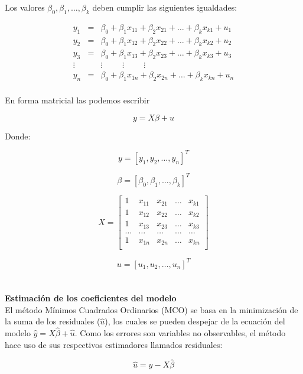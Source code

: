 \documentclass[base=hide,12pt]{elegantbook}
\begin{document}
	Los valores $\beta_{0},\beta_{1},\dots,\beta_{k}$ deben cumplir las siguientes igualdades:
\begin{center}
		\begin{eqnarray*}
		y_{1}&=&\beta_{0}+\beta_{1}x_{11}+\beta_{2}x_{21}+\dots+\beta_{k}x_{k1}+u_{1} \\
		y_{2}&=&\beta_{0}+\beta_{1}x_{12}+\beta_{2}x_{22}+\dots+\beta_{k}x_{k2}+u_{2} \\
		y_{3}&=&\beta_{0}+\beta_{1}x_{13}+\beta_{2}x_{23}+\dots+\beta_{k}x_{k3}+u_{3} \\
		\vdots && \vdots \hspace{1cm} \vdots \hspace{1cm} \vdots \\
		y_{n}&=&\beta_{0}+\beta_{1}x_{1n}+\beta_{2}x_{2n}+\dots+\beta_{k}x_{kn}+u_{n} \\
	\end{eqnarray*}
\end{center}

	En forma matricial las podemos escribir
\begin{Box2}{}	
	\begin{equation*}
	y = X \beta + u 
	\end{equation*}
\end{Box2}

	Donde: 
	
	$$y = [y_{1},y_{2}, \dots, y_{n}]^{T}$$ 
	
	$$\beta =[\beta_{0},\beta_{1},\dots, \beta_{k}]^{T}$$
	
	$$X= \begin{bmatrix}
	{1}   &{x_{11}}&{x_{21}}& \dots & x_{k1}  \\
	{1}   &{x_{12}}&{x_{22}}& \dots & x_{k2}  \\
	{1}   &{x_{13}}&{x_{23}}& \dots & x_{k3}  \\
	\dots & \dots  &\dots   & \dots & \dots \\
	{1}   &{x_{1n}}&{x_{2n}}& \dots & x_{kn} \\
	\end{bmatrix}$$
	
	$$u =[u_{1},u_{2},\dots,u_{n}]^{T}$$   \\ \\
	
	
	\textcolor{col4}{\Large \bf Estimación de los coeficientes del modelo} 	
	\\
	
El método Mínimos Cuadrados Ordinarios (MCO) se basa en la minimización de la suma de los residuales ($\widehat{u}$), los cuales se pueden despejar de la ecuación del modelo $\widehat{y} = X \widehat{\beta} + \widehat{u}$. Como los errores son variables no observables, el método hace uso de sus respectivos estimadores llamados residuales:
\begin{Box2}{}
	\begin{equation*}
	\widehat{u} = \widehat{y} - X\widehat{\beta}
	\end{equation*}
\end{Box2}
	
\end{document}
